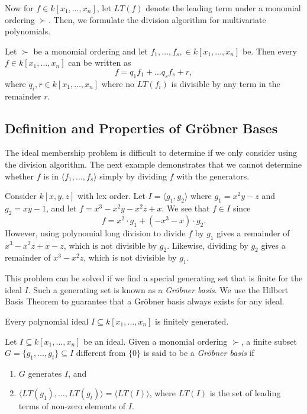 \documentclass[../main.tex]{subfiles}
\begin{document}
    Now for $f\in k[x_1,\dots,x_n]$, let $LT(f)$ denote the leading term under a monomial ordering $\succ$. Then, we formulate the division algorithm for multivariate polynomials.
    \begin{theorem}
        Let $\succ$ be a monomial ordering and let $f_1,\dots,f_s,\in k[x_1,\dots,x_n]$ be. Then every $f\in k[x_1,\dots,x_n]$ can be written as 
        $$f=q_1f_1+\dots q_sf_s+r,$$
        where $q_i,r\in k[x_1,\dots,x_n]$ where no $LT(f_i)$ is divisible by any term in the remainder $r$. 
    \end{theorem}
    
    \subsection{Definition and Properties of Gr\"obner Bases}
    The ideal membership problem is difficult to determine if we only consider using the division algorithm. The next example demonstrates that we cannot determine whether $f$ is in $\langle f_1,\dots,f_s\rangle$ simply by dividing $f$ with the generators.

    \begin{example} \label{ex:div}
        Consider $k[x,y,z]$ with lex order. Let $I=\langle g_1,g_2\rangle$ where $g_1=x^2y-z$ and $g_2=xy-1$, and let $f=x^3-x^2y-x^2z+x$. We see that $f\in I$ since
        $$f=x^2\cdot g_1+(-x^3-x)\cdot g_2.$$
        However, using polynomial long division to divide $f$ by $g_1$ gives a remainder of $x^3-x^2z+x-z$, which is not divisible by $g_2$. Likewise, dividing by $g_2$ gives a remainder of $x^3-x^2z$, which is not divisible by $g_1$.
    \end{example}

    This problem can be solved if we find a special generating set that is finite for the ideal $I$. Such a generating set is known as a \emph{Gr\"obner basis}. We use the Hilbert Basis Theorem to guarantee that a Gr\"obner basis always exists for any ideal.
    \begin{theorem}
        Every polynomial ideal $I\subseteq k[x_1,\dots,x_n]$ is finitely generated.
    \end{theorem}
    
    \begin{definition}
        Let $I\subseteq k[x_1,\dots,x_n]$ be an ideal. Given a monomial ordering $\succ$, a finite subset $G=\{g_1,\dots, g_t\}\subseteq I$ different from $\{0\}$ is said to be a \emph{Gr\"obner basis} if
        \begin{enumerate}
            \item $G$ generates $I$, and
            \item $\langle LT(g_1),\dots,LT(g_t)\rangle=\langle LT(I)\rangle$, where $LT(I)$ is the set of leading terms of non-zero elements of $I$.
        \end{enumerate}
    \end{definition}
\end{document}
